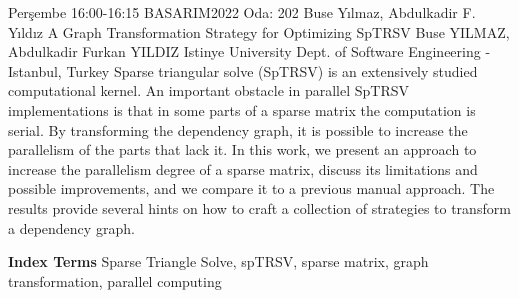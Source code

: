 
    \begin{abstract_basarim}
    {Perşembe 16:00-16:15}
    {BASARIM2022}
    {Oda: 202}
    {Buse Yılmaz, Abdulkadir F. Yıldız}
    {A Graph Transformation Strategy for Optimizing SpTRSV}
    {%
    Buse YILMAZ, Abdulkadir Furkan YILDIZ}
    {%
    }
    {%
    Istinye University Dept. of Software Engineering - Istanbul, Turkey}
    Sparse triangular solve (SpTRSV) is an extensively studied computational kernel. An important obstacle in parallel SpTRSV implementations is that in some parts of a sparse matrix the computation is serial. By transforming the dependency graph, it is possible to increase the parallelism of the parts that lack it. In this work, we present an approach to increase the parallelism degree of a sparse matrix, discuss its limitations and possible improvements, and we compare it to a previous manual approach. The results provide several hints on how to craft a collection of strategies to transform a dependency graph. 
    
            \textbf{Index Terms} \newline{}Sparse Triangle Solve, spTRSV, sparse matrix, graph transformation, parallel computing
    \end{abstract_basarim}
    